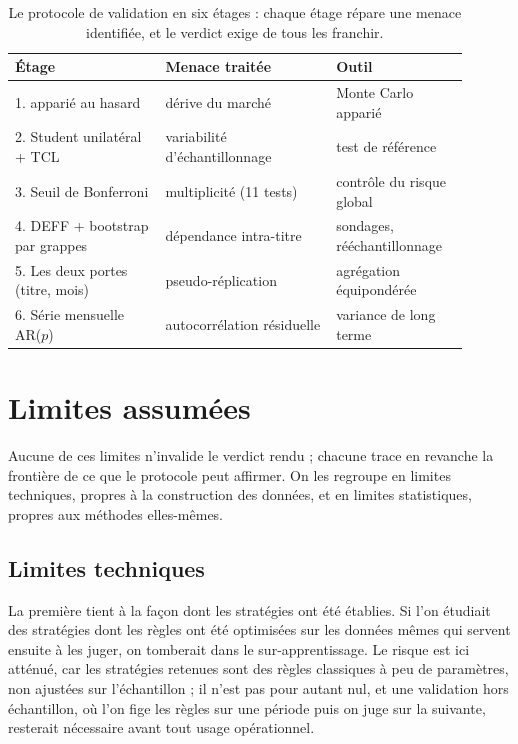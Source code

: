 \begin{table}[H]
\centering
\caption{Le protocole de validation en six étages : chaque étage répare
une menace identifiée, et le verdict exige de tous les franchir.}
\label{tab:protocole}
\small
\begin{tabular}{@{}p{0.30\linewidth}p{0.34\linewidth}p{0.26\linewidth}@{}}
\toprule
Étage & Menace traitée & Outil \\
\midrule
1. \edgevar{} apparié au hasard & dérive du marché & Monte Carlo apparié \\
2. Student unilatéral + TCL & variabilité d'échantillonnage & test de référence \\
3. Seuil de Bonferroni & multiplicité (11 tests) & contrôle du risque global \\
4. DEFF + bootstrap par grappes & dépendance intra-titre & sondages, rééchantillonnage \\
5. Les deux portes (titre, mois) & pseudo-réplication & agrégation équipondérée \\
6. Série mensuelle AR($p$) & autocorrélation résiduelle & variance de long terme \\
\bottomrule
\end{tabular}
\end{table}


\section{Limites assumées}
\label{sec:limites}

Aucune de ces limites n'invalide le verdict rendu ; chacune trace en revanche
la frontière de ce que le protocole peut affirmer. On les regroupe en limites
techniques, propres à la construction des données, et en limites statistiques,
propres aux méthodes elles-mêmes.

\subsection*{Limites techniques}

La première tient à la façon dont les stratégies ont été établies. Si l'on
étudiait des stratégies dont les règles ont été optimisées sur les données
mêmes qui servent ensuite à les juger, on tomberait dans le sur-apprentissage.
Le risque est ici atténué, car les stratégies retenues sont des règles
classiques à peu de paramètres, non ajustées sur l'échantillon ; il n'est pas
pour autant nul, et une validation hors échantillon, où l'on fige les règles
sur une période puis on juge sur la suivante, resterait nécessaire avant tout
usage opérationnel.

